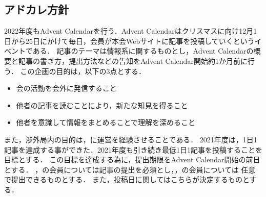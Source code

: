 \subsection*{アドカレ方針}


2022年度もAdvent Calendarを行う．Advent Calendarはクリスマスに向け12月1日から25日にかけて毎日，会員が本会Webサイトに記事を投稿していくというイベントである．
記事のテーマは情報系に関するものとし，Advent Calendarの概要と記事の書き方，提出方法などの告知をAdvent Calendar開始約1か月前に行う．
この企画の目的は，以下の3点とする．
\begin{itemize}
    \item 会の活動を会外に発信すること
    \item 他者の記事を読むことにより，新たな知見を得ること
    \item 他者を意識して情報をまとめることで理解を深めること
\end{itemize}
また，渉外局内の目的は，\firstGrade{}に運営を経験させることである．
2021年度は，1日1記事を達成する事ができた．2021年度も引き続き最低1日1記事を投稿することを目標とする．
この目標を達成する為に，提出期限をAdvent Calendar開始の前日とする．
\firstGrade{}，\secondGrade{}の会員については記事の提出を必須とし，\thirdGrade{}，\fourthGrade{}の会員については
任意で提出できるものとする．
また，投稿日に関してはこちらが決定するものとする．
